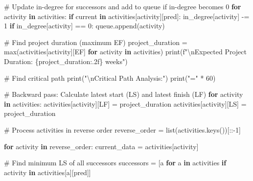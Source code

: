 \documentclass[
  letterpaper,
  DIV=11,
  numbers=noendperiod]{scrreprt}
\newenvironment{Shaded}{\begin{snugshade}}{\end{snugshade}}
\newcommand{\BuiltInTok}[1]{\textcolor[rgb]{0.00,0.23,0.31}{#1}}
\newcommand{\CharTok}[1]{\textcolor[rgb]{0.13,0.47,0.30}{#1}}
\newcommand{\CommentTok}[1]{\textcolor[rgb]{0.37,0.37,0.37}{#1}}
\newcommand{\ControlFlowTok}[1]{\textcolor[rgb]{0.00,0.23,0.31}{\textbf{#1}}}
\newcommand{\DecValTok}[1]{\textcolor[rgb]{0.68,0.00,0.00}{#1}}
\newcommand{\KeywordTok}[1]{\textcolor[rgb]{0.00,0.23,0.31}{\textbf{#1}}}
\newcommand{\NormalTok}[1]{\textcolor[rgb]{0.00,0.23,0.31}{#1}}
\newcommand{\OperatorTok}[1]{\textcolor[rgb]{0.37,0.37,0.37}{#1}}
\newcommand{\SpecialCharTok}[1]{\textcolor[rgb]{0.37,0.37,0.37}{#1}}
\newcommand{\SpecialStringTok}[1]{\textcolor[rgb]{0.13,0.47,0.30}{#1}}
\newcommand{\StringTok}[1]{\textcolor[rgb]{0.13,0.47,0.30}{#1}}
\begin{document}
\begin{Shaded}
\begin{Highlighting}[]
        \CommentTok{\# Update in{-}degree for successors and add to queue if in{-}degree becomes 0}
        \ControlFlowTok{for}\NormalTok{ activity }\KeywordTok{in}\NormalTok{ activities:}
            \ControlFlowTok{if}\NormalTok{ current }\KeywordTok{in}\NormalTok{ activities[activity][}\StringTok{\textquotesingle{}pred\textquotesingle{}}\NormalTok{]:}
\NormalTok{                in\_degree[activity] }\OperatorTok{{-}=} \DecValTok{1}
                \ControlFlowTok{if}\NormalTok{ in\_degree[activity] }\OperatorTok{==} \DecValTok{0}\NormalTok{:}
\NormalTok{                    queue.append(activity)}
    
    \CommentTok{\# Find project duration (maximum EF)}
\NormalTok{    project\_duration }\OperatorTok{=} \BuiltInTok{max}\NormalTok{(activities[activity][}\StringTok{\textquotesingle{}EF\textquotesingle{}}\NormalTok{] }\ControlFlowTok{for}\NormalTok{ activity }\KeywordTok{in}\NormalTok{ activities)}
    \BuiltInTok{print}\NormalTok{(}\SpecialStringTok{f"}\CharTok{\textbackslash{}n}\SpecialStringTok{Expected Project Duration: }\SpecialCharTok{\{}\NormalTok{project\_duration}\SpecialCharTok{:.2f\}}\SpecialStringTok{ weeks"}\NormalTok{)}
    
    \CommentTok{\# Find critical path}
    \BuiltInTok{print}\NormalTok{(}\StringTok{"}\CharTok{\textbackslash{}n}\StringTok{Critical Path Analysis:"}\NormalTok{)}
    \BuiltInTok{print}\NormalTok{(}\StringTok{"="} \OperatorTok{*} \DecValTok{60}\NormalTok{)}
    
    \CommentTok{\# Backward pass: Calculate latest start (LS) and latest finish (LF)}
    \ControlFlowTok{for}\NormalTok{ activity }\KeywordTok{in}\NormalTok{ activities:}
\NormalTok{        activities[activity][}\StringTok{\textquotesingle{}LF\textquotesingle{}}\NormalTok{] }\OperatorTok{=}\NormalTok{ project\_duration}
\NormalTok{        activities[activity][}\StringTok{\textquotesingle{}LS\textquotesingle{}}\NormalTok{] }\OperatorTok{=}\NormalTok{ project\_duration}
    
    \CommentTok{\# Process activities in reverse order}
\NormalTok{    reverse\_order }\OperatorTok{=} \BuiltInTok{list}\NormalTok{(activities.keys())[::}\OperatorTok{{-}}\DecValTok{1}\NormalTok{]}
    
    \ControlFlowTok{for}\NormalTok{ activity }\KeywordTok{in}\NormalTok{ reverse\_order:}
\NormalTok{        current\_data }\OperatorTok{=}\NormalTok{ activities[activity]}
        
        \CommentTok{\# Find minimum LS of all successors}
\NormalTok{        successors }\OperatorTok{=}\NormalTok{ [a }\ControlFlowTok{for}\NormalTok{ a }\KeywordTok{in}\NormalTok{ activities }\ControlFlowTok{if}\NormalTok{ activity }\KeywordTok{in}\NormalTok{ activities[a][}\StringTok{\textquotesingle{}pred\textquotesingle{}}\NormalTok{]]}
        

\end{Highlighting}
\end{Shaded}
\end{document}
